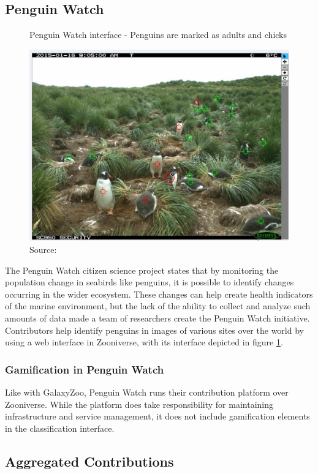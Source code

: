 \subsection{Penguin Watch}

\begin{figure}[ht]
    \centering
    \caption{Penguin Watch interface - Penguins are marked as adults and chicks}
    \includegraphics[width=0.8\linewidth]{images/background/penguinwatch.jpg}
    \caption*{Source: \cite{penguin2015watch}}
    \label{fig:penguin-watch}
\end{figure}

The Penguin Watch citizen science project states that by monitoring the population change in seabirds like penguins, it is possible to identify changes occurring in the wider ecosystem. These changes can help create health indicators of the marine environment, but the lack of the ability to collect and analyze such amounts of data made a team of researchers create the Penguin Watch initiative. Contributors help identify penguins in images of various sites over the world by using a web interface in Zooniverse, with its interface depicted in figure \ref{fig:penguin-watch}.

\subsubsection*{Gamification in Penguin Watch}

Like with GalaxyZoo, Penguin Watch runs their contribution platform over Zooniverse. While the platform does take responsibility for maintaining infrastructure and service management, it does not include gamification elements in the classification interface.

\subsection{Aggregated Contributions}

